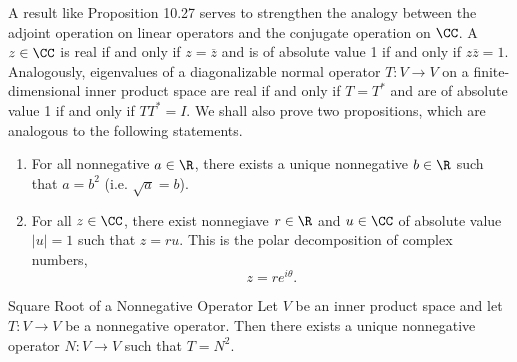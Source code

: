 \documentclass[linearalgebra]{subfiles}
\begin{document}
    \begin{remark}
        A result like Proposition 10.27 serves to strengthen the analogy between the adjoint operation on linear operators and the conjugate operation on $\CC$. A $z\in\CC$ is real if and only if $z=\overline{z}$ and is of absolute value 1 if and only if $z\overline{z} =1$. Analogously, eigenvalues of a diagonalizable normal operator $T:V\to V$ on a finite-dimensional inner product space are real if and only if $T=T^*$ and are of absolute value 1 if and only if $TT^* = I$. We shall also prove two propositions, which are analogous to the following statements.
        \begin{enumerate}
            \item For all nonnegative $a\in\R$, there exists a unique nonnegative $b\in\R$ such that $a=b^2$ (i.e. $\sqrt{a}=b$).
            \item For all $z\in\CC$, there exist nonnegiave $r\in\R$ and $u\in\CC$ of absolute value $\left| u \right| =1$ such that $z=ru$. This is the polar decomposition of complex numbers,
                \begin{equation*}
                    z = re^{i\theta}.
                \end{equation*}
        \end{enumerate}
    \end{remark}

    \begin{prop}{Square Root of a Nonnegative Operator}
        Let $V$ be an inner product space and let $T:V\to V$ be a nonnegative operator. Then there exists a unique nonnegative operator $N:V\to V$ such that $T=N^2$.
    \end{prop}
\end{document}
